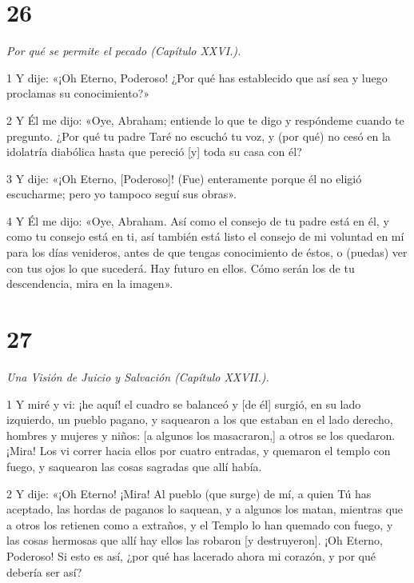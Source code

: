 \chapter{26}

\par \textit{Por qué se permite el pecado (Capítulo XXVI.).}

\par 1 Y dije: «¡Oh Eterno, Poderoso! ¿Por qué has establecido que así sea y luego proclamas su conocimiento?»

\par 2 Y Él me dijo: «Oye, Abraham; entiende lo que te digo y respóndeme cuando te pregunto. ¿Por qué tu padre Taré no escuchó tu voz, y (por qué) no cesó en la idolatría diabólica hasta que pereció [y] toda su casa con él?

\par 3 Y dije: «¡Oh Eterno, [Poderoso]! (Fue) enteramente porque él no eligió escucharme; pero yo tampoco seguí sus obras».

\par 4 Y Él me dijo: «Oye, Abraham. Así como el consejo de tu padre está en él, y como tu consejo está en ti, así también está listo el consejo de mi voluntad en mí para los días venideros, antes de que tengas conocimiento de éstos, o (puedas) ver con tus ojos lo que sucederá. Hay futuro en ellos. Cómo serán los de tu descendencia, mira en la imagen».

\chapter{27}

\par \textit{Una Visión de Juicio y Salvación (Capítulo XXVII.).}

\par 1 Y miré y vi: ¡he aquí! el cuadro se balanceó y [de él] surgió, en su lado izquierdo, un pueblo pagano, y saquearon a los que estaban en el lado derecho, hombres y mujeres y niños: [a algunos los masacraron,] a otros se los quedaron. ¡Mira! Los vi correr hacia ellos por cuatro entradas, y quemaron el templo con fuego, y saquearon las cosas sagradas que allí había.

\par 2 Y dije: «¡Oh Eterno! ¡Mira! Al pueblo (que surge) de mí, a quien Tú has aceptado, las hordas de paganos lo saquean, y a algunos los matan, mientras que a otros los retienen como a extraños, y el Templo lo han quemado con fuego, y las cosas hermosas que allí hay ellos las robaron [y destruyeron]. ¡Oh Eterno, Poderoso! Si esto es así, ¿por qué has lacerado ahora mi corazón, y por qué debería ser así?

